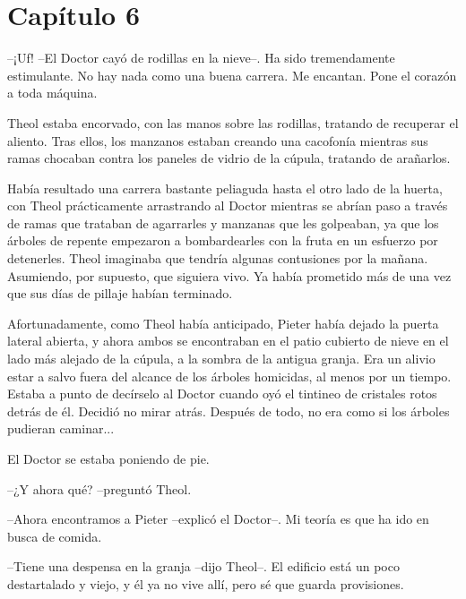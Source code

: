 \chapter*{Capítulo 6}

--¡Uf! --El Doctor cayó de rodillas en la nieve--. Ha sido tremendamente estimulante. No hay nada como una buena carrera. Me encantan. Pone el corazón a toda máquina.



Theol estaba encorvado, con las manos sobre las rodillas, tratando de recuperar el aliento. Tras ellos, los manzanos estaban creando una cacofonía mientras sus ramas chocaban contra los paneles de vidrio de la cúpula, tratando de arañarlos.



Había resultado una carrera bastante peliaguda hasta el otro lado de la huerta, con Theol prácticamente arrastrando al Doctor mientras se abrían paso a través de ramas que trataban de agarrarles y manzanas que les golpeaban, ya que los árboles de repente empezaron a bombardearles con la fruta en un esfuerzo por detenerles. Theol imaginaba que tendría algunas contusiones por la mañana. Asumiendo, por supuesto, que siguiera vivo. Ya había prometido más de una vez que sus días de pillaje habían terminado.



Afortunadamente, como Theol había anticipado, Pieter había dejado la puerta lateral abierta, y ahora ambos se encontraban en el patio cubierto de nieve en el lado más alejado de la cúpula, a la sombra de la antigua granja. Era un alivio estar a salvo fuera del alcance de los árboles homicidas, al menos por un tiempo. Estaba a punto de decírselo al Doctor cuando oyó el tintineo de cristales rotos detrás de él. Decidió no mirar atrás. Después de todo, no era como si los árboles pudieran caminar...



El Doctor se estaba poniendo de pie.



--¿Y ahora qué? --preguntó Theol.



--Ahora encontramos a Pieter --explicó el Doctor--. Mi teoría es que ha ido en busca de comida.



--Tiene una despensa en la granja --dijo Theol--. El edificio está un poco destartalado y viejo, y él ya no vive allí, pero sé que guarda provisiones.



